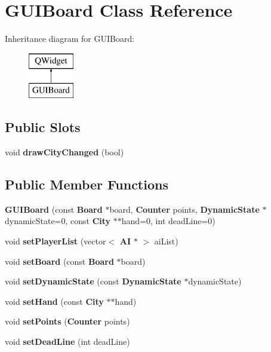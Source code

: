 \section{G\-U\-I\-Board Class Reference}
\label{class_g_u_i_board}
Inheritance diagram for G\-U\-I\-Board\-:\begin{figure}[H]
\begin{center}
\leavevmode
\includegraphics[height=2.000000cm]{class_g_u_i_board}
\end{center}
\end{figure}
\subsection*{Public Slots}
\begin{DoxyCompactItemize}
\item 
void {\bfseries draw\-City\-Changed} (bool)\label{class_g_u_i_board_a441b66d1ab55b3c4a124f82444c84a1c}

\end{DoxyCompactItemize}
\subsection*{Public Member Functions}
\begin{DoxyCompactItemize}
\item 
{\bfseries G\-U\-I\-Board} (const {\bf Board} $\ast$board, {\bf Counter} points, {\bf Dynamic\-State} $\ast$dynamic\-State=0, const {\bf City} $\ast$$\ast$hand=0, int dead\-Line=0)\label{class_g_u_i_board_acae87f19723767f0eb6f3cdba4b6aea4}

\item 
void {\bfseries set\-Player\-List} (vector$<$ {\bf A\-I} $\ast$ $>$ ai\-List)\label{class_g_u_i_board_a10e47d4e8a59768f04afd28458e0008d}

\item 
void {\bfseries set\-Board} (const {\bf Board} $\ast$board)\label{class_g_u_i_board_a20a8580d81bd67d721963ffd12bc7803}

\item 
void {\bfseries set\-Dynamic\-State} (const {\bf Dynamic\-State} $\ast$dynamic\-State)\label{class_g_u_i_board_a200d1d872a7a0824e7f2339053e6df38}

\item 
void {\bfseries set\-Hand} (const {\bf City} $\ast$$\ast$hand)\label{class_g_u_i_board_acd682cca775182be3a7f195badb64156}

\item 
void {\bfseries set\-Points} ({\bf Counter} points)\label{class_g_u_i_board_aa80c593e781bd767ed9cc54c5e0c1df9}

\item 
void {\bfseries set\-Dead\-Line} (int dead\-Line)\label{class_g_u_i_board_af887b55fd3ad3dfd69f44728042372e9}

\end{DoxyCompactItemize}
